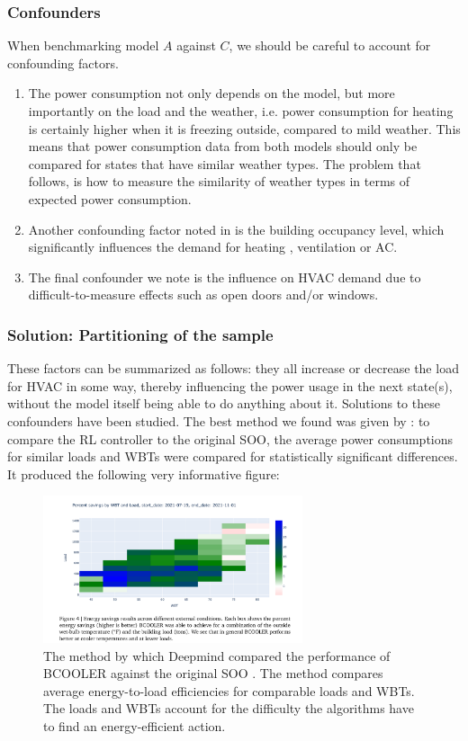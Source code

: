 \documentclass{article}
\theoremstyle{definition}
\theoremstyle{remark}
\begin{document}
\subsubsection{Confounders} \label{Method:DatAn:confounders}
When benchmarking model $A$ against $C$, we should be careful to account for confounding factors.
\begin{enumerate}
    \item The power consumption not only depends on the model, but more importantly on the load and the weather, i.e. power consumption for heating is certainly higher when it is freezing outside, compared to mild weather. This means that power consumption data from both models should only be compared for states that have similar weather types. The problem that follows, is how to measure the similarity of weather types in terms of expected power consumption.
    \item Another confounding factor noted in \cite{luo2022controlling} is the building occupancy level, which significantly influences the demand for heating , ventilation or AC.
    \item The final confounder we note is the influence on HVAC demand due to difficult-to-measure effects such as open doors and/or windows.
\end{enumerate}

\subsubsection{Solution: Partitioning of the sample}
These factors can be summarized as follows: they all increase or decrease the load for HVAC in some way, thereby influencing the power usage in the next state(s), without the model itself being able to do anything about it. Solutions to these confounders have been studied. The best method we found was given by \cite{luo2022controlling}: to compare the RL controller 
to the original SOO, the average power consumptions for similar loads and WBTs were compared for statistically significant differences. It produced the following very informative figure:

\begin{figure}
    \centering
    \includegraphics[width=3in]{Screenshot from 2023-05-20 22-20-56.png}
    \caption{The method by which Deepmind compared the performance of BCOOLER against the original SOO \cite{luo2022controlling}. The method compares average energy-to-load efficiencies for comparable loads and WBTs. The loads and WBTs account for the difficulty the algorithms have to find an energy-efficient action.}
    \label{fig:my_label}
\end{figure}
\end{document}
